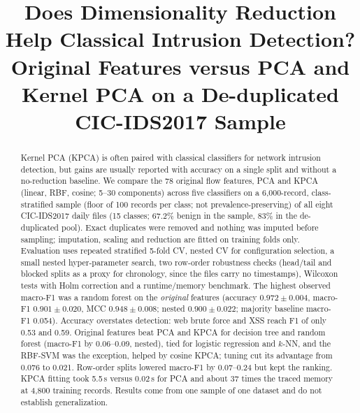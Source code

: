 \documentclass[conference]{IEEEtran}
\begin{document}
\title{Does Dimensionality Reduction Help Classical Intrusion Detection? Original Features versus PCA and Kernel PCA on a De-duplicated CIC-IDS2017 Sample}

\author{
\and
{}
}

\maketitle

\begin{abstract}
Kernel PCA (KPCA) is often paired with classical classifiers for network intrusion detection, but gains are usually reported with accuracy on a single split and without a no-reduction baseline. We compare the 78 original flow features, PCA and KPCA (linear, RBF, cosine; 5--30 components) across five classifiers on a 6{,}000-record, class-stratified sample (floor of 100 records per class; not prevalence-preserving) of all eight CIC-IDS2017 daily files (15 classes; 67.2\% benign in the sample, 83\% in the de-duplicated pool). Exact duplicates were removed and nothing was imputed before sampling; imputation, scaling and reduction are fitted on training folds only. Evaluation uses repeated stratified 5-fold CV, nested CV for configuration selection, a small nested hyper-parameter search, two row-order robustness checks (head/tail and blocked splits as a proxy for chronology, since the files carry no timestamps), Wilcoxon tests with Holm correction and a runtime/memory benchmark. The highest observed macro-F1 was a random forest on the \emph{original} features (accuracy $0.972\pm0.004$, macro-F1 $0.901\pm0.020$, MCC $0.948\pm0.008$; nested $0.900\pm0.022$; majority baseline macro-F1 0.054). Accuracy overstates detection: web brute force and XSS reach F1 of only 0.53 and 0.59. Original features beat PCA and KPCA for decision tree and random forest (macro-F1 by 0.06--0.09, nested), tied for logistic regression and $k$-NN, and the RBF-SVM was the exception, helped by cosine KPCA; tuning cut its advantage from 0.076 to 0.021. Row-order splits lowered macro-F1 by 0.07--0.24 but kept the ranking. KPCA fitting took 5.5\,s versus 0.02\,s for PCA and about 37 times the traced memory at 4{,}800 training records. Results come from one sample of one dataset and do not establish generalization.
\end{abstract}
\end{document}

